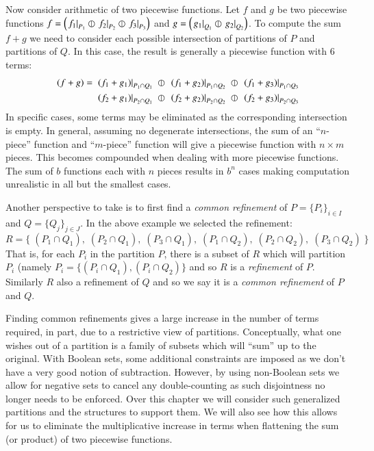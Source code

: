 Now consider arithmetic of two piecewise functions. Let $f$ and $g$ be two piecewise functions
$f = \left(\left.f_1\right|_{P_1} \varobar \left.f_2\right|_{P_2} \varobar \left.f_3\right|_{P_3} \right)$ 
and $g= \left( \left.g_1\right|_{Q_1} \varobar \left.g_2\right|_{Q_2} \right)$.
To compute the sum $f+g$ we need to consider each possible intersection of partitions of $P$ and partitions of $Q$.
In this case, the result is generally a piecewise function with 6 terms:
\begin{align*}
	(f+g) = \;
	&\left.(f_1+g_1)\right|_{P_1 \cap Q_1} 
		\;\varobar\; \left.(f_1+g_2)\right|_{P_1 \cap Q_2} 
		\;\varobar\; \left.(f_1+g_3)\right|_{P_1 \cap Q_3}\notag\\
	&\left.(f_2+g_1)\right|_{P_2 \cap Q_1} 
	 	\;\varobar\; \left.(f_2+g_2)\right|_{P_2 \cap Q_2} 
	 	\;\varobar\; \left.(f_2+g_3)\right|_{P_2 \cap Q_3}
\end{align*}
In specific cases, some terms may be eliminated as the corresponding intersection is empty. 
In general, assuming no degenerate intersections, 
the sum of an ``$n$-piece'' function and ``$m$-piece'' function will give a piecewise function with $n \times m$ pieces.
This becomes compounded when dealing with more piecewise functions. 
The sum of $b$ functions each with $n$ pieces results in $b^n$ cases making computation unrealistic 
in all but the smallest cases.

Another perspective to take is to first find a \emph{common refinement} of ${P=\{P_i\}_{i\in I}}$ 
and ${Q=\{Q_j\}_{j\in J}}$. In the above example we selected the refinement:
\begin{equation*}
	R=\Big\{\;
		(P_1 \cap Q_1),\;(P_2 \cap Q_1),\;(P_3 \cap Q_1),\;
		(P_1 \cap Q_2),\;(P_2 \cap Q_2),\;(P_3 \cap Q_2) \;
	\Big\}
\end{equation*}
That is, for each $P_i$ in the partition $P$, there is a subset of $R$ which will partition $P_i$ 
(namely $P_i = \{ (P_i \cap Q_1), (P_i \cap Q_2) \}$ and so $R$ is a \emph{refinement} of $P$.
Similarly $R$ also a refinement of $Q$ and so we say it is a \emph{common refinement} of $P$ and $Q$.


Finding common refinements gives a large increase in the number of terms required, 
in part, due to a restrictive view of partitions.
Conceptually, what one wishes out of a partition is a family of subsets which will ``sum'' up to the original.
With Boolean sets, some additional constraints are imposed as we don't have a very good notion of subtraction.
However, by using non-Boolean sets we allow for negative sets to cancel any double-counting
as such disjointness no longer needs to be enforced.
Over this chapter we will consider such generalized partitions and the structures to support them.
We will also see how this allows for us to eliminate the multiplicative increase in terms when flattening the sum
(or product) of two piecewise functions.






